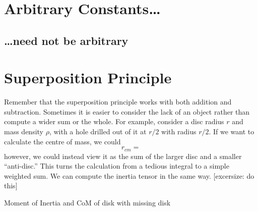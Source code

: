 \section{Arbitrary Constants\ldots}
\subsection{\ldots need not be arbitrary}

\section{Superposition Principle}

Remember that the superposition principle works with both addition and subtraction. Some\-times it is easier to consider the lack of an object rather than compute a wider sum or the whole. For example, consider a disc radius \(r\) and mass density \(\rho\), with a hole drilled out of it at \(r/2\) with radius \(r/2\). If we want to calculate the centre of mass, we could 
\[r_{cm} = \]
however, we could instead view it as the sum of the larger disc and a smaller ``anti-disc.'' This turns the calculation from a tedious integral to a simple weighted sum. We can compute the inertia tensor in the same way. [excersize: do this]

Moment of Inertia and CoM of disk with missing disk

